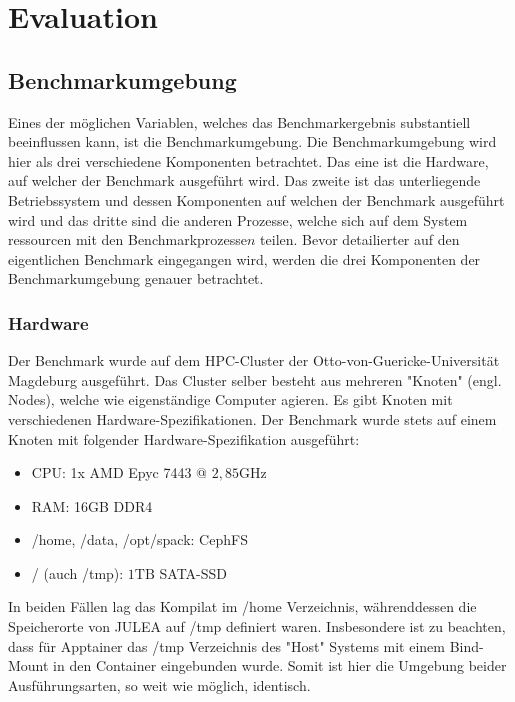 \chapter{Evaluation} \label{cha:evaluation}

\section{Benchmarkumgebung}

Eines der möglichen Variablen, welches das Benchmarkergebnis substantiell beeinflussen kann,  ist die Benchmarkumgebung. Die Benchmarkumgebung wird hier als drei verschiedene Komponenten betrachtet. Das eine ist die Hardware, auf welcher der Benchmark ausgeführt wird. Das zweite ist das unterliegende Betriebssystem und dessen Komponenten auf welchen der Benchmark ausgeführt wird und das dritte sind die anderen Prozesse, welche sich auf dem System ressourcen mit den Benchmarkprozesse\(n\) teilen. Bevor detailierter auf den eigentlichen Benchmark eingegangen wird, werden die drei Komponenten der Benchmarkumgebung genauer betrachtet.

\subsection{Hardware}

Der Benchmark wurde auf dem HPC-Cluster der Otto-von-Guericke-Universität Magdeburg ausgeführt. Das Cluster selber besteht aus mehreren "Knoten" (engl. Nodes), welche wie eigenständige Computer agieren. Es gibt Knoten mit verschiedenen Hardware-Spezifikationen. Der Benchmark wurde stets auf einem Knoten mit folgender Hardware-Spezifikation ausgeführt:

\begin{itemize}
    \item CPU: 1x AMD Epyc 7443 @ $2,85\text{GHz}$
    \item RAM: 16GB DDR4
    \item /home, /data, /opt/spack: CephFS
    \item /\*\* (auch /tmp): $1\text{TB}$ SATA-SSD  
\end{itemize}

In beiden Fällen lag das Kompilat im /home Verzeichnis, währenddessen die Speicherorte von JULEA auf /tmp definiert waren. Insbesondere ist zu beachten, dass für Apptainer das /tmp Verzeichnis des "Host" Systems mit einem Bind-Mount in den Container eingebunden wurde. Somit ist hier die Umgebung beider Ausführungsarten, so weit wie möglich, identisch.

